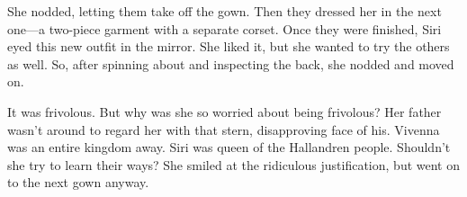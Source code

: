 She nodded, letting them take off the gown. Then they dressed her in the next one—a two-piece garment with a separate corset. Once they were finished, Siri eyed this new outfit in the mirror. She liked it, but she wanted to try the others as well. So, after spinning about and inspecting the back, she nodded and moved on.

It was frivolous. But why was she so worried about being frivolous? Her father wasn’t around to regard her with that stern, disapproving face of his. Vivenna was an entire kingdom away. Siri was queen of the Hallandren people. Shouldn’t she try to learn their ways? She smiled at the ridiculous justification, but went on to the next gown anyway.

